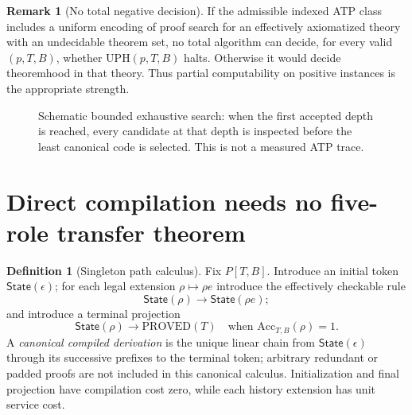 \documentclass[11pt]{article}
\theoremstyle{definition}
\newtheorem{definition}[theorem]{Definition}
\newtheorem{remark}[theorem]{Remark}
\newcommand{\PROVED}{\mathrm{PROVED}}
\begin{document}
\begin{remark}[No total negative decision]
If the admissible indexed ATP class includes a uniform encoding of proof search for an effectively axiomatized theory with an undecidable theorem set, no total algorithm can decide, for every valid $(p,T,B)$, whether $\mathrm{UPH}(p,T,B)$ halts. Otherwise it would decide theoremhood in that theory. Thus partial computability on positive instances is the appropriate strength.
\end{remark}

\begin{figure}[ht]
\centering
{}
\caption{Schematic bounded exhaustive search: when the first accepted depth is reached, every candidate at that depth is inspected before the least canonical code is selected. This is not a measured ATP trace.}
\end{figure}

\section{Direct compilation needs no five-role transfer theorem}
\begin{definition}[Singleton path calculus]
Fix $P[T,B]$. Introduce an initial token $\mathsf{State}(\epsilon)$; for each legal extension $\rho\mapsto\rho e$ introduce the effectively checkable rule
\[
\mathsf{State}(\rho)\longrightarrow\mathsf{State}(\rho e);
\]
and introduce a terminal projection
\[
\mathsf{State}(\rho)\longrightarrow\PROVED(T)
\quad\text{when }\mathrm{Acc}_{T,B}(\rho)=1.
\]
A \emph{canonical compiled derivation} is the unique linear chain from $\mathsf{State}(\epsilon)$ through its successive prefixes to the terminal token; arbitrary redundant or padded proofs are not included in this canonical calculus. Initialization and final projection have compilation cost zero, while each history extension has unit service cost.
\end{definition}
\end{document}
